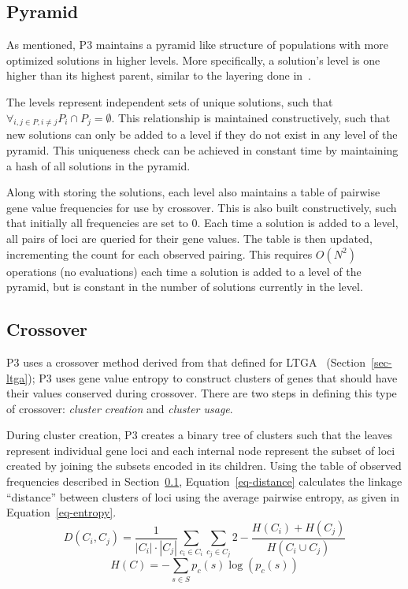 \documentclass{sig-alternate}
\begin{document}
\subsection{Pyramid}
\label{sec-pyramid}
As mentioned, P3 maintains a pyramid like structure of populations
with more optimized solutions in higher levels. More specifically, a solution's level is one higher than
its highest parent, similar to the layering done
in~\cite{hornby:2006:alps}.

The levels represent independent sets of unique solutions, such that
$\forall_{i, j \in P, i \neq j} P_i \cap P_j = \emptyset$.  This relationship
is maintained constructively, such that new solutions can only be added to a level
if they do not exist in any level of the pyramid.  This uniqueness check can be
achieved in constant time by maintaining a hash of all solutions in the pyramid.

Along with storing the solutions, each level also maintains a table of pairwise
gene value frequencies for use by crossover.  This is also built constructively, such that initially
all frequencies are set to 0.  Each time a solution is added to a level, all
pairs of loci are queried for their gene values.  The table is then updated,
incrementing the count for each observed pairing.  This requires $O(N^2)$ operations
(no evaluations) each time a solution is added to a level of the pyramid, but is
constant in the number of solutions currently in the level.

\subsection{Crossover}
\label{sec-crossover}
P3 uses a crossover method derived from that defined for LTGA~\cite{thierens:2013:ltgahiff}
(Section~\ref{sec-ltga});
P3 uses gene value entropy to construct clusters of genes that should have their values
conserved during crossover.  There are two steps in
defining this type of crossover: \emph{cluster creation} and \emph{cluster usage}.

During cluster creation, P3 creates a binary tree of clusters such that the leaves
represent individual gene loci and each internal node represent the subset of loci created
by joining the subsets encoded in its children.
Using the table of observed frequencies described in Section~\ref{sec-pyramid}, Equation~\ref{eq-distance}
calculates the linkage ``distance'' between clusters of loci using the average pairwise
entropy, as given in Equation~\ref{eq-entropy}.
\begin{equation}
  D(C_i,C_j) = \frac{1}{\left | C_i \right |\cdot \left |C_j \right|}\sum_{c_i \in C_i}\sum_{c_j \in C_j} 
  2 - \frac{H(C_i) + H(C_j)}{H(C_i \cup C_j)}
  \label{eq-distance}
\end{equation}
\begin{equation}
  H(C) = -\sum_{s\in S} p_c(s)\log(p_c(s))
  \label{eq-entropy}
\end{equation}
\end{document}
